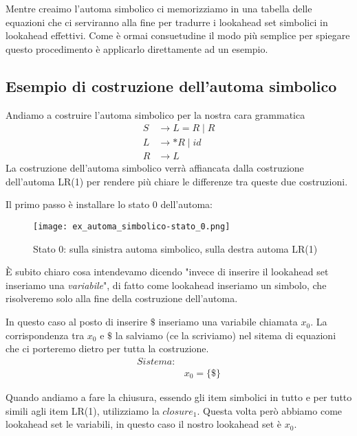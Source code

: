 \documentclass[class=book, crop=false, oneside, 12pt]{standalone}
\begin{document}
Mentre creaimo l'automa simbolico ci memorizziamo in una tabella delle equazioni che ci serviranno alla fine per tradurre i lookahead set simbolici in lookahead effettivi. Come è ormai consuetudine il modo più semplice per spiegare questo procedimento è applicarlo direttamente ad un esempio.

\subsection*{Esempio di costruzione dell'automa simbolico}
Andiamo a costruire l'automa simbolico per la nostra cara grammatica
\begin{align*}
    S &\to L = R \mid R \\
    L &\to *R \mid id \\
    R &\to L
\end{align*}
La costruzione dell'automa simbolico verrà affiancata dalla costruzione dell'automa LR(1) per rendere più chiare le differenze tra queste due costruzioni.

Il primo passo è installare lo stato 0 dell'automa:
\begin{figure}
    \centering
    \texttt{[image: ex\_automa\_simbolico-stato\_0.png]}
    \caption{Stato 0: sulla sinistra automa simbolico, sulla destra automa LR(1)}
    \label{img:ex_automa_simbolico-stato_0}
\end{figure}
È subito chiaro cosa intendevamo dicendo "invece di inserire il lookahead set inseriamo una \emph{variabile}", di fatto come lookahead inseriamo un simbolo, che risolveremo solo alla fine della costruzione dell'automa.

In questo caso al posto di inserire \(\$\) inseriamo una variabile chiamata \(x_0\).
La corrispondenza tra \(x_0\) e \(\$\) la salviamo (ce la scriviamo) nel sitema di equazioni che ci porteremo dietro per tutta la costruzione.
\begin{align*}
    Sistema:& \\
            & x_0 = \{\$\}
\end{align*}

Quando andiamo a fare la chiusura, essendo gli item simbolici in tutto e per tutto simili agli item LR(1), utilizziamo la \(closure_1\).
Questa volta però abbiamo come lookahead set le variabili, in questo caso il nostro lookahead set è \(x_0\).
\end{document}
